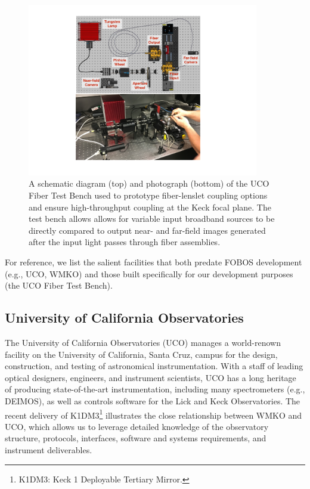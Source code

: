 \documentclass[oneside,11pt]{amsart}
\begin{document}
\begin{figure}[h!]
%
\vskip -0.1in
%
\includegraphics[width=0.9\textwidth]{figs/test_bench.pdf}
%
\caption{\small  A schematic diagram (top) and photograph (bottom) of
the UCO Fiber Test Bench used to prototype fiber-lenslet coupling
options and ensure high-throughput coupling at the Keck focal plane.
The test bench allows allows for variable input broadband sources to be
directly compared to output near- and far-field images generated after
the input light passes through fiber assemblies.}
%
\label{fig:testbench}
%
\end{figure}

\noindent For reference, we list the salient facilities that both
predate FOBOS development (e.g., UCO, WMKO) and those built specifically
for our development purposes (the UCO Fiber Test Bench).

\subsection{University of California Observatories}

The University of California Observatories (UCO) manages a world-renown
facility on the University of California, Santa Cruz, campus for the
design, construction, and testing of astronomical instrumentation.  With
a staff of leading optical designers, engineers, and instrument
scientists, UCO has a long heritage of producing state-of-the-art
instrumentation, including many spectrometers (e.g., DEIMOS), as well as
controls software for the Lick and Keck Observatories.  The recent
delivery of K1DM3\footnote{K1DM3: Keck 1 Deployable Tertiary Mirror.}
illustrates the close relationship between WMKO and UCO, which allows us
to leverage detailed knowledge of the observatory structure, protocols,
interfaces, software and systems requirements, and instrument
deliverables.
\end{document}
